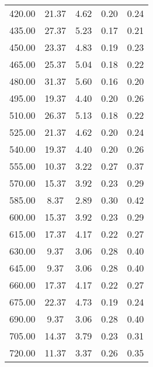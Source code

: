 \begin{table}
\begin{tabular}{S S S S S }
420.00  & 21.37  & 4.62  & 0.20  & 0.24\\
435.00  & 27.37  & 5.23  & 0.17  & 0.21\\
450.00  & 23.37  & 4.83  & 0.19  & 0.23\\
465.00  & 25.37  & 5.04  & 0.18  & 0.22\\
480.00  & 31.37  & 5.60  & 0.16  & 0.20\\
495.00  & 19.37  & 4.40  & 0.20  & 0.26\\
510.00  & 26.37  & 5.13  & 0.18  & 0.22\\
525.00  & 21.37  & 4.62  & 0.20  & 0.24\\
540.00  & 19.37  & 4.40  & 0.20  & 0.26\\
555.00  & 10.37  & 3.22  & 0.27  & 0.37\\
570.00  & 15.37  & 3.92  & 0.23  & 0.29\\
585.00  & 8.37  & 2.89  & 0.30  & 0.42\\
600.00  & 15.37  & 3.92  & 0.23  & 0.29\\
615.00  & 17.37  & 4.17  & 0.22  & 0.27\\
630.00  & 9.37  & 3.06  & 0.28  & 0.40\\
645.00  & 9.37  & 3.06  & 0.28  & 0.40\\
660.00  & 17.37  & 4.17  & 0.22  & 0.27\\
675.00  & 22.37  & 4.73  & 0.19  & 0.24\\
690.00  & 9.37  & 3.06  & 0.28  & 0.40\\
705.00  & 14.37  & 3.79  & 0.23  & 0.31\\
720.00  & 11.37  & 3.37  & 0.26  & 0.35\\
\bottomrule
\end{tabular}
\end{table}
